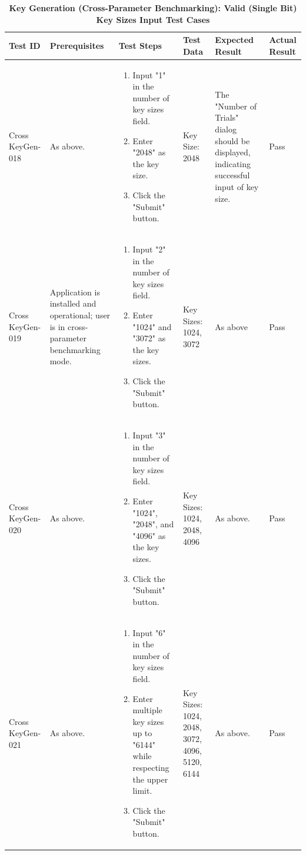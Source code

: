 \documentclass[]{final_report}
\theoremstyle{definition}
\begin{document}
\begin{longtable}{|p{1.5cm}|p{2.5cm}|p{3.5cm}|p{2.5cm}|p{3cm}|p{2cm}|}
  \caption{\textbf{Key Generation (Cross-Parameter Benchmarking): Valid (Single Bit) Key Sizes Input Test Cases}} \\
  \hline
  \textbf{Test ID} & \textbf{Prerequisites} & \textbf{Test Steps} & \textbf{Test Data} & \textbf{Expected Result} & \textbf{Actual Result} \\
  \hline
  Cross
  KeyGen-018 & As above. & 
  \begin{enumerate}
  \item Input "1" in the number of key sizes field.
  \item Enter "2048" as the key size.
  \item Click the "Submit" button.
  \end{enumerate} & Key Size: 2048 & The "Number of Trials" dialog should be displayed, indicating successful input of key size. & Pass \\
  \hline
  Cross
  KeyGen-019 & Application is installed and operational; user is in cross-parameter benchmarking mode. & 
  \begin{enumerate}
  \item Input "2" in the number of key sizes field.
  \item Enter "1024" and "3072" as the key sizes.
  \item Click the "Submit" button.
  \end{enumerate} & Key Sizes: 1024, 3072 & As above & Pass \\
  \hline
  Cross
  KeyGen-020 & As above. & 
  \begin{enumerate}
  \item Input "3" in the number of key sizes field.
  \item Enter "1024", "2048", and "4096" as the key sizes.
  \item Click the "Submit" button.
  \end{enumerate} & Key Sizes: 1024, 2048, 4096 & As above. & Pass \\
  \hline
  Cross
  KeyGen-021 & As above. & 
  \begin{enumerate}
  \item Input "6" in the number of key sizes field.
  \item Enter multiple key sizes up to "6144" while respecting the upper limit.
  \item Click the "Submit" button.
  \end{enumerate} & Key Sizes: 1024, 2048, 3072, 4096, 5120, 6144 & As above. & Pass \\

\end{longtable}
\end{document}
